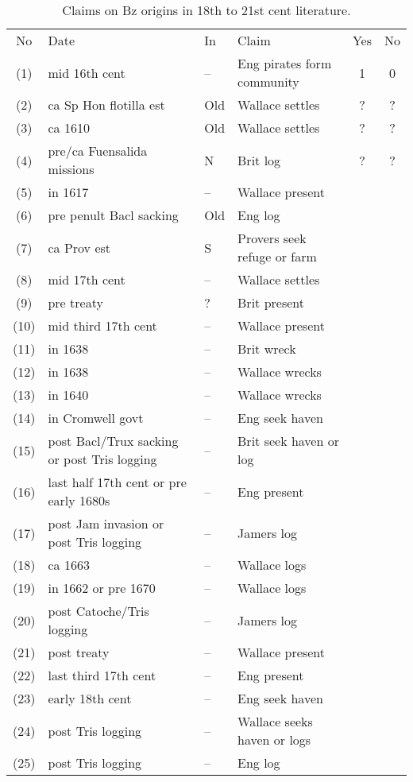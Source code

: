 \documentclass{amsart}
\theoremstyle{definition}%
\theoremstyle{definition}%
\theoremstyle{remark}%
\theoremstyle{definition}%
\theoremstyle{definition}%
\begin{document}
\begin{table}%
\caption{Claims on Bz origins in 18th to 21st cent literature.}
\label{tab1}
\begin{sideways}
\begin{tabular}{cp{.4\textheight}lp{.3\textheight}cc}
No	&Date	&In	&Claim	&Yes	&No\\
(1)	&mid 16th cent	&--	&Eng pirates form community	&1	&0\\%
(2)	&ca Sp Hon flotilla est	&Old	&Wallace settles	&?	&?\\%
(3)	&ca 1610	&Old&Wallace settles	&?	&?\\%
(4)	&pre/ca Fuensalida missions	&N	&Brit log	&?	&?\\%
(5)	&in 1617	&--	&Wallace present&&\\%
(6)	&pre penult Bacl sacking	&Old	&Eng log	&&\\%
(7)	&ca Prov est	&S	&Provers seek refuge or farm	&&\\%
(8)	&mid 17th cent	&--	&Wallace settles	&&\\%
(9)	&pre treaty	&?	&Brit present	&&\\%
(10)	&mid third 17th cent	&--	&Wallace present	&&\\%
(11)	&in 1638	&--	&Brit wreck	&&\\%
(12)	&in 1638	&--	&Wallace wrecks	&&\\%
(13)	&in 1640	&--	&Wallace wrecks	&&\\%
(14)	&in Cromwell govt	&--	&Eng seek haven	&&\\%
(15)	&post Bacl/Trux sacking or post Tris logging	&--	&Brit seek haven or log	&&\\%
(16)	&last half 17th cent or pre early 1680s	&--	&Eng present	&&\\%
(17)	&post Jam invasion or post Tris logging	&--	&Jamers log	&&\\%
(18)	&ca 1663	&--	&Wallace logs	&&\\%
(19)	&in 1662	 or pre 1670&--	&Wallace logs	&&\\%
(20)	&post Catoche/Tris logging	&--	&Jamers log	&&\\%
(21)	&post treaty	&--	&Wallace present	&&\\%
(22)	&last third 17th cent	&--	&Eng present	&&\\%
(23)	&early 18th cent	&--	&Eng seek haven	&&\\%
(24)	&post Tris logging	&--	&Wallace seeks haven or logs	&&\\%
(25)	&post Tris logging	&--	&Eng log	&&%
\end{tabular}
\end{sideways}
\end{table}
%
%
\end{document}
